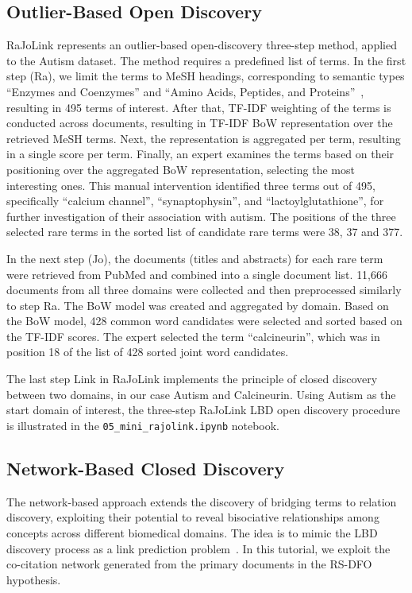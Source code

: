 \documentclass[runningheads]{llncs}
\begin{document}
\subsection{Outlier-Based Open Discovery}
\label{sec:open_RaJoLink}

RaJoLink represents an outlier-based open-discovery three-step method, applied to the Autism dataset. The method requires a predefined list of terms. In the first step (Ra), we limit the terms to MeSH headings, corresponding to semantic types ``Enzymes and Coenzymes'' and ``Amino Acids, Peptides, and Proteins''~\cite{lipscomb2000medical}, resulting in 495 terms of interest. After that, TF-IDF weighting of the terms is conducted across documents, resulting in TF-IDF BoW representation over the retrieved MeSH terms. Next, the representation is aggregated per term, resulting in a single score per term. Finally, an expert examines the terms based on their positioning over the aggregated BoW representation, selecting the most interesting ones. This manual intervention identified three terms out of 495, specifically ``calcium channel'', ``synaptophysin'', and ``lactoylglutathione'', for further investigation of their association with autism. The positions of the three selected rare terms in the sorted list of candidate rare terms were 38, 37 and 377. 

In the next step (Jo), the documents (titles and abstracts) for each rare term were retrieved from PubMed and combined into a single document list. {11,666} documents from all three domains were collected and then preprocessed similarly to step Ra. The BoW model was created and aggregated by domain. Based on the BoW model, 428 common word candidates were selected and sorted based on the TF-IDF scores. The expert selected the term ``calcineurin'', which was in position 18 of the list of 428 sorted joint word candidates.

The last step Link in RaJoLink implements the principle of closed discovery between two domains, in our case Autism and Calcineurin. Using Autism as the start domain of interest, the three-step RaJoLink LBD open discovery procedure~\cite{petric2012outlier} is illustrated in the \texttt{05\_mini\_rajolink.ipynb} notebook.

\subsection{Network-Based Closed Discovery}
\label{sec:graph_based}

The network-based approach extends the discovery of bridging terms to relation discovery, exploiting their potential to reveal bisociative relationships among concepts across different biomedical domains. The idea is to mimic the LBD discovery process as a link prediction problem~\cite{kastrin2016link}. In this tutorial, we exploit the co-citation network generated from the primary documents in the RS-DFO hypothesis. 
\end{document}
